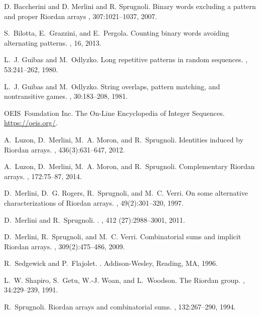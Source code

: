 \begin{thebibliography}{10}

D. Baccherini and D. Merlini and R. Sprugnoli.
\newblock Binary words excluding a pattern and proper {R}iordan arrays
, 307:1021--1037, 2007.

S.~Bilotta, E.~Grazzini, and E.~Pergola.
\newblock Counting binary words avoiding alternating patterns.
, 16, 2013.

L.~J. Guibas and M.~Odlyzko.
\newblock Long repetitive patterns in random sequences.
, 53:241--262,
  1980.

L.~J. Guibas and M.~Odlyzko.
\newblock String overlaps, pattern matching, and nontransitive games.
, 30:183--208, 1981.

OEIS~Foundation Inc.
\newblock The On-Line {E}ncyclopedia of {I}nteger {S}equences.
\newblock \url{https://oeis.org/}.

A.~Luzon, D.~Merlini, M.~A. Moron, and R.~Sprugnoli.
\newblock Identities induced by {R}iordan arrays.
, 436(3):631--647, 2012.

A.~Luzon, D.~Merlini, M.~A. Moron, and R.~Sprugnoli.
\newblock Complementary {R}iordan arrays.
, 172:75--87, 2014.

D.~Merlini, D.~G. Rogers, R.~Sprugnoli, and M.~C. Verri.
\newblock On some alternative characterizations of {R}iordan arrays.
, 49(2):301--320, 1997.

D.~Merlini and R.~Sprugnoli.
.
, 412 (27):2988--3001, 2011.

D.~Merlini, R.~Sprugnoli, and M.~C. Verri.
\newblock Combinatorial sums and implicit {R}iordan arrays.
, 309(2):475--486, 2009.

R.~Sedgewick and P.~Flajolet.
.
\newblock Addison-Wesley, Reading, MA, 1996.

L.~W. Shapiro, S.~Getu, W.-J. Woan, and L.~Woodson.
\newblock The {R}iordan group.
, 34:229--239, 1991.

R.~Sprugnoli.
\newblock Riordan arrays and combinatorial sums.
, 132:267--290, 1994.




\end{thebibliography}

\fi


